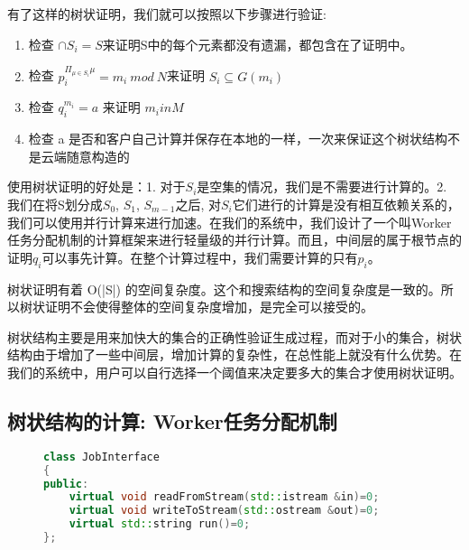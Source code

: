 有了这样的树状证明，我们就可以按照以下步骤进行验证:
\begin{enumerate}
  \item 检查 $\cap S_i = S$来证明S中的每个元素都没有遗漏，都包含在了证明中。
  \item 检查 $p_i^{\Pi_{\mu \in S_i} \mu} = m_i\ mod\ N$来证明 $S_i \subseteq G(m_i)$
  \item 检查 $q_i^{m_i} = a$ 来证明 $m_i in M$
  \item 检查 a 是否和客户自己计算并保存在本地的一样，一次来保证这个树状结构不是云端随意构造的
\end{enumerate}

使用树状证明的好处是：1. 对于$S_i$是空集的情况，我们是不需要进行计算的。2. 我们在将S划分成$S_0$, $S_1$, $S_{m-1}$之后, 对$S_i$它们进行的计算是没有相互依赖关系的，我们可以使用并行计算来进行加速。在我们的系统中，我们设计了一个叫Worker任务分配机制的计算框架来进行轻量级的并行计算。而且，中间层的属于根节点的证明$q_i$可以事先计算。在整个计算过程中，我们需要计算的只有$p_i$。

树状证明有着 O(|S|) 的空间复杂度。这个和搜索结构的空间复杂度是一致的。所以树状证明不会使得整体的空间复杂度增加，是完全可以接受的。

树状结构主要是用来加快大的集合的正确性验证生成过程，而对于小的集合，树状结构由于增加了一些中间层，增加计算的复杂性，在总性能上就没有什么优势。在我们的系统中，用户可以自行选择一个阈值来决定要多大的集合才使用树状证明。

\subsection{树状结构的计算: Worker任务分配机制}
\begin{figure}[htb]
\begin{lstlisting}[language=C++] 
class JobInterface
{
public:
    virtual void readFromStream(std::istream &in)=0;
    virtual void writeToStream(std::ostream &out)=0;
    virtual std::string run()=0;
};
\end{lstlisting}
\end{figure}

